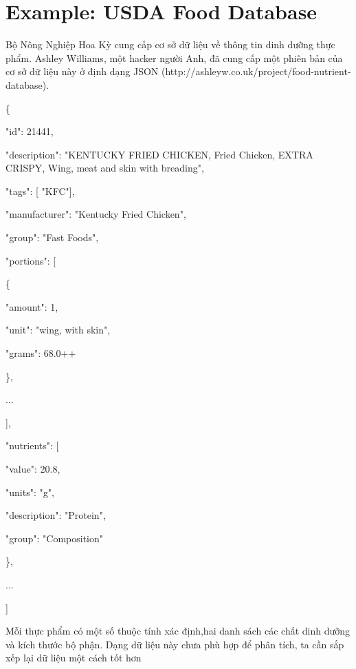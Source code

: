 \chapter{Example: USDA Food Database}
\par\textup {Bộ Nông Nghiệp Hoa Kỳ cung cấp cơ sở dữ liệu về thông tin dinh dưỡng thực phẩm. Ashley Williams, một hacker người Anh, đã cung cấp một phiên bản của cơ sở dữ liệu này ở định dạng JSON (http://ashleyw.co.uk/project/food-nutrient-database).}
\par\quad\textup\{
\par\quad\quad\textup{ "id": 21441,}
\par\quad\quad\textup{ "description": "KENTUCKY FRIED CHICKEN, Fried Chicken, EXTRA CRISPY,
Wing, meat and skin with breading",}
\par\quad\quad\textup {"tags": [ "KFC"],}
\par\quad\quad\textup {"manufacturer": "Kentucky Fried Chicken",}
\par\quad\quad\textup{ "group": "Fast Foods",}
\par\quad\quad\textup{"portions": [}
\par\quad\quad\quad\textup\{
\par\quad\quad\quad\quad\textup {"amount": 1,}
\par\quad\quad\quad\quad\textup {"unit": "wing, with skin",}
\par\quad\quad\quad\quad\textup {"grams": 68.0++}
\par\quad\quad\quad\textup\},
\par\quad\quad\quad\textup {...}
\par\quad\quad\textup],
\par\quad\quad\textup{ "nutrients": [}
\par\quad\quad\quad\textup {{}}
\par\quad\quad\quad\quad\textup{ "value": 20.8,}
\par\quad\quad\quad\quad\textup{ "units": "g",}
\par\quad\quad\quad\quad\textup{ "description": "Protein",}
\par\quad\quad\quad\quad\textup{ "group": "Composition"}
\par\quad\quad\quad\textup\},
\par\quad\quad\textup{...}
\par\quad\quad\textup]
\par\textup{Mỗi thực phẩm có một số thuộc tính xác định,hai danh sách các chất dinh dưỡng và kích thước bộ phận. Dạng dữ liệu này chưa phù hợp để phân tích, ta cần sắp xếp lại dữ liệu một cách tốt hơn}
